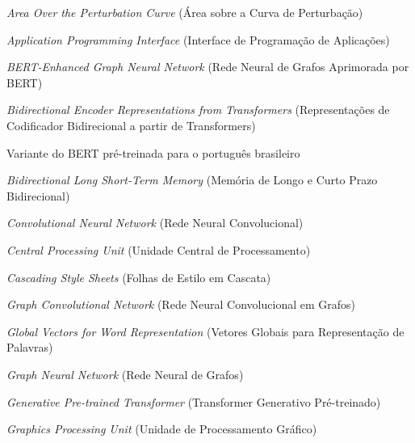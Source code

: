 \documentclass[
    12pt,                %
    openright,           %
    oneside,             %
    a4paper,             %
    english,             %
    brazil               %
]{abntex2}
\begin{document}
 \listoffigures*
 \cleardoublepage

 \listoftables*
 \cleardoublepage

\begin{siglas}
  \item[AOPC] \textit{Area Over the Perturbation Curve} (Área sobre a Curva de Perturbação)
  \item[API] \textit{Application Programming Interface} (Interface de Programação de Aplicações)
  \item[BEGNN] \textit{BERT-Enhanced Graph Neural Network} (Rede Neural de Grafos Aprimorada por BERT)
  \item[BERT] \textit{Bidirectional Encoder Representations from Transformers} (Representações de Codificador Bidirecional a partir de Transformers)
  \item[BERTimbau] Variante do BERT pré-treinada para o português brasileiro
  \item[BiLSTM] \textit{Bidirectional Long Short-Term Memory} (Memória de Longo e Curto Prazo Bidirecional)
  \item[CNN] \textit{Convolutional Neural Network} (Rede Neural Convolucional)
  \item[CPU] \textit{Central Processing Unit} (Unidade Central de Processamento)
  \item[CSS] \textit{Cascading Style Sheets} (Folhas de Estilo em Cascata)
  \item[GCN] \textit{Graph Convolutional Network} (Rede Neural Convolucional em Grafos)
  \item[GloVe] \textit{Global Vectors for Word Representation} (Vetores Globais para Representação de Palavras)
  \item[GNN] \textit{Graph Neural Network} (Rede Neural de Grafos)
  \item[GPT] \textit{Generative Pre-trained Transformer} (Transformer Generativo Pré-treinado)
  \item[GPU] \textit{Graphics Processing Unit} (Unidade de Processamento Gráfico)

\end{siglas}
\end{document}
